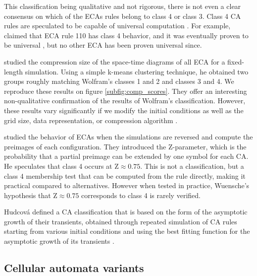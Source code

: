 This classification being qualitative and not rigorous, there is not even a
clear consensus on which of the \acp{ECA} rules belong to class 4 or class 3.
Class 4 \ac{CA} rules are speculated to be capable of universal computation
\parencite{wolframUniversalityComplexityCellular1984}. For example,
\textcite{liStructureElementaryCellular1990} claimed that \ac{ECA} rule 110 has
class 4 behavior, and it was eventually proven to be universal
\parencite{cookUniversalityElementaryCellular2004}, but no other \ac{ECA} has
been proven universal since.

\textcite{zenilCompressionBasedInvestigationDynamical2010} studied the
compression size of the space-time diagrams of all \ac{ECA} for a fixed-length
simulation. Using a simple k-means clustering technique, he obtained two groups
roughly matching Wolfram’s classes 1 and 2 and classes 3 and 4. We reproduce
these results on figure \ref{subfig:comp_scores}. They offer an interesting
non-qualitative confirmation of the results of Wolfram's classification.
However, these results vary significantly if we modify the initial conditions as
well as the grid size, data representation, or compression algorithm
\parencite{hudcovaClassificationComplexSystems2020}.

\textcite{wuenscheGlobalDynamicsCellular1992} studied the behavior of \acp{ECA}
when the simulations are reversed and compute the preimages of each
configuration. They introduced the Z-parameter, which is the probability that a
partial preimage can be extended by one symbol for each \ac{CA}. He speculates
that class 4 occurs at $\text{Z} \approx 0.75$. This is not a classification, but a
class 4 membership test that can be computed from the rule directly, making it
practical compared to alternatives. However when tested in practice, Wuensche's
hypothesis that $\text{Z} \approx 0.75$ corresponds to class 4 is rarely verified.

Hudcová defined a \ac{CA} classification that is based on the form of the
asymptotic growth of their transients, obtained through repeated simulation of
\ac{CA} rules starting from various initial conditions and using the best
fitting function for the asymptotic growth of its transients
\parencite{hudcovaClassificationComplexSystems2020,
  hudcovaClassificationDiscreteDynamical2022}.

\subsection{Cellular automata variants}

